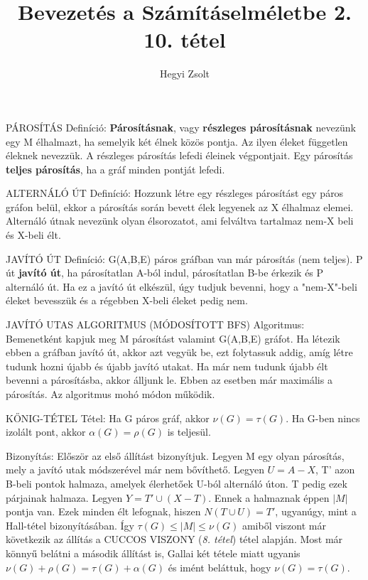 \documentclass[]{article}
\title{Bevezetés a Számításelméletbe 2.\\{\large 10. tétel}}
\author{Hegyi Zsolt}
\begin{document}
\maketitle
\begin{shaded}
PÁROSÍTÁS Definíció: \textbf{Párosításnak}, vagy \textbf{részleges párosításnak} nevezünk egy M élhalmazt, ha semelyik két élnek közös pontja. Az ilyen éleket független éleknek nevezzük. A részleges párosítás lefedi éleinek végpontjait. Egy párosítás \textbf{teljes párosítás}, ha a gráf minden pontját lefedi.
\end{shaded}
\begin{shaded}
ALTERNÁLÓ ÚT Definíció: Hozzunk létre egy részleges párosítást egy páros gráfon belül, ekkor a párosítás során bevett élek legyenek az X élhalmaz elemei. Alternáló útnak nevezünk olyan élsorozatot, ami felváltva tartalmaz nem-X beli és X-beli élt.
\end{shaded}
\begin{shaded}
JAVÍTÓ ÚT Definíció: G(A,B,E) páros gráfban van már párosítás (nem teljes). P út \textbf{javító út}, ha párosítatlan A-ból indul, párosítatlan B-be érkezik és P alternáló út. Ha ez a javító út elkészül, úgy tudjuk bevenni, hogy a "nem-X"-beli éleket bevesszük és a régebben X-beli éleket pedig nem.
\end{shaded}
\begin{shaded}
JAVÍTÓ UTAS ALGORITMUS (MÓDOSÍTOTT BFS) Algoritmus: Bemenetként kapjuk meg M párosítást valamint G(A,B,E) gráfot. Ha létezik ebben a gráfban javító út, akkor azt vegyük be, ezt folytassuk addig, amíg létre tudunk hozni újabb és újabb javító utakat. Ha már nem tudunk újabb élt bevenni a párosításba, akkor álljunk le. Ebben az esetben már maximális a párosítás. Az algoritmus mohó módon működik.
\end{shaded}
\begin{framed}
KŐNIG-TÉTEL Tétel: Ha G páros gráf, akkor $\nu(G) = \tau(G)$. Ha G-ben nincs izolált pont, akkor $\alpha(G) = \rho(G)$ is teljesül.
\end{framed}
\begin{leftbar}
Bizonyítás: Először az első állítást bizonyítjuk. Legyen M egy olyan párosítás, mely a javító utak módszerével már nem bővíthető. Legyen $U = A - X$, T' azon B-beli pontok halmaza, amelyek élerhetőek U-ból alternáló úton. T pedig ezek párjainak halmaza. Legyen $Y = T' \cup (X - T)$. Ennek a halmaznak éppen $|M|$ pontja van. Ezek minden élt lefognak, hiszen $N(T\cup U) = T'$, ugyanúgy, mint a Hall-tétel bizonyításában. Így $\tau(G) \leq |M| \leq \nu(G)$ amiből viszont már következik az állítás a CUCCOS VISZONY (\textit{8. tétel}) tétel alapján. Most már könnyű belátni a második állítást is, Gallai két tétele miatt ugyanis $\nu(G) + \rho(G) = \tau(G) + \alpha(G)$ és imént beláttuk, hogy $\nu(G) = \tau(G)$.
\end{leftbar}
\end{document}
